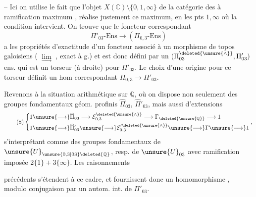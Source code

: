 
-- Ici on utilise le fait que l'objet $X(\mathbb C)\setminus\{0,1,\infty\}$ de la catégorie des  à ramification maximum , réalise justement ce maximum, en les pts $1,\infty$ où la condition intervient.
On trouve que le foncteur correspondant
\[
\tag{7 bis}
\Pi'_{03}\text{-}\mathrm{Ens}\longrightarrow(\Pi_{0,3}\text{-}\mathrm{Ens})
\]
a les propriétés d'exactitude d'un foncteur associé à un morphisme de topos galoisiens
( $\underset{\longrightarrow}{\lim}$ , exact à g.) et est donc défini par un $(\Pi_{03}^{\deleted{\unsure{\wedge}}},\Pi'_{03})$ ens. qui est un torseur (à droite) pour $\Pi'_{03}$. Le choix d'une origine pour ce torseur définit  un hom correspondant $\Pi_{0,3}\longrightarrow\Pi'_{03}$.


Revenons à la situation arithmétique sur $\mathbb Q$, où on dispose non seulement des groupes fondamentaux géom. profinis $\widehat{\Pi}_{03}$, $\widehat{\Pi}'_{03}$, mais aussi d'extensions
\[
\tag{8}
\left\{\begin{aligned}
1&\unsure{\longrightarrow}\widehat{\Pi}_{03}\longrightarrow\mathcal E_{0,3}^{\deleted{\unsure{\wedge}}}\longrightarrow\Gamma_{\deleted{\unsure{\mathbb Q}}}\longrightarrow1\\
1&\unsure{\longrightarrow}\widehat{\Pi}'_{03}\unsure{\longrightarrow}\mathcal E_{0,3}^{\prime\deleted{\unsure{\wedge}}}\unsure{\longrightarrow}\Gamma\unsure{\longrightarrow}1
\end{aligned}\right.,
\]
s'interprétant comme des groupes fondamentaux de $\unsure{U}_{\unsure{0,3|03}\deleted{\mathbb Q}}$, resp. de $\unsure{U}_{03}$ avec ramification imposée $2\{1\}+3\{\infty\}$. Les raisonnements


précédents s'étendent à ce cadre, et fournissent donc un homomorphisme  
,
modulo conjugaison par un autom. int. de $\Pi'_{03}$.

